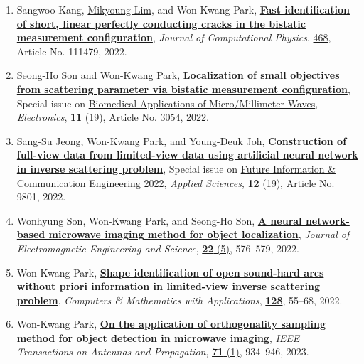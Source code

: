\documentclass[10pt,A4]{article}
\begin{document}
\begin{enumerate}
\item\label{A-JCOMP2022B} Sangwoo Kang, \href{https://www.mikyounglim.net}{Mikyoung Lim}, and Won-Kwang Park, \href{https://doi.org/10.1016/j.jcp.2022.111479}{\textbf{Fast identification of short, linear perfectly conducting cracks in the bistatic measurement configuration}}, \textit{Journal of Computational Physics}, \href{https://www.sciencedirect.com/journal/journal-of-computational-physics/vol/468/suppl/C}{468}, Article No. 111479, 2022.
\item\label{A-ELECTRONICS2022} Seong-Ho Son and Won-Kwang Park, \href{https://doi.org/10.3390/electronics11193054}{\textbf{Localization of small objectives from scattering parameter via bistatic measurement configuration}}, Special issue on \href{https://www.mdpi.com/journal/electronics/special_issues/biomedical_MMW}{Biomedical Applications of Micro/Millimeter Waves}, \textit{Electronics}, \href{https://www.mdpi.com/2079-9292/11}{\textbf{11}} (\href{https://www.mdpi.com/2079-9292/11/19}{19}), Article No. 3054, 2022.
\item\label{A-APPLSCI2022} Sang-Su Jeong, Won-Kwang Park, and Young-Deuk Joh, \href{https://doi.org/10.3390/app12199801}{\textbf{Construction of full-view data from limited-view data using artificial neural network in inverse scattering problem}}, Special issue on \href{https://www.mdpi.com/journal/applsci/special_issues/ICFICE2022}{Future Information \& Communication Engineering 2022}, \textit{Applied Sciences}, \href{https://www.mdpi.com/2076-3417/12}{\textbf{12}} (\href{https://www.mdpi.com/2076-3417/12/19}{19}), Article No. 9801, 2022.
\item\label{A-JEES2022} Wonhyung Son, Won-Kwang Park, and Seong-Ho Son, \href{https://doi.org/10.26866/jees.2022.5.r.125}{\textbf{A neural network-based microwave imaging method for object localization}}, \textit{Journal of Electromagnetic Engineering and Science}, \href{http://jees.kr/current/index.php?vol=22&no=5}{\textbf{22} (5)}, 576--579, 2022.
\item\label{A-CAMWA2022C} Won-Kwang Park, \href{https://doi.org/10.1016/j.camwa.2022.10.010}{\textbf{Shape identification of open sound-hard arcs without priori information in limited-view inverse scattering problem}}, \textit{Computers \& Mathematics with Applications}, \href{https://www.sciencedirect.com/journal/computers-and-mathematics-with-applications/vol/128/suppl/C}{\textbf{128}}, 55--68, 2022.
\item\label{A-IEEETAP2023} Won-Kwang Park, \href{https://doi.org/10.1109/TAP.2022.3220033}{\textbf{On the application of orthogonality sampling method for object detection in microwave imaging}}, \textit{IEEE Transactions on Antennas and Propagation}, \href{https://ieeexplore.ieee.org/xpl/tocresult.jsp?isnumber=10021137&punumber=8}{\textbf{71} (1)}, 934--946, 2023.

\end{enumerate}
\end{document}
